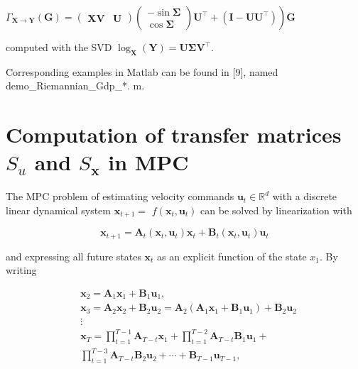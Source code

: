 \documentclass[10pt]{article}
\begin{document}
$\left.\Gamma_{\boldsymbol{X} \rightarrow \boldsymbol{Y}}(\boldsymbol{G})=\left(\begin{array}{ll}\boldsymbol{X} \boldsymbol{V} & \boldsymbol{U}\end{array}\right)\left(\begin{array}{c}-\sin \boldsymbol{\Sigma} \\ \cos \boldsymbol{\Sigma}\end{array}\right) \boldsymbol{U}^{\top}+\left(\boldsymbol{I}-\boldsymbol{U} \boldsymbol{U}^{\top}\right)\right) \boldsymbol{G}$

computed with the SVD $\log _{\boldsymbol{X}}(\boldsymbol{Y})=\boldsymbol{U} \boldsymbol{\Sigma} \boldsymbol{V}^{\top}$.

Corresponding examples in Matlab can be found in [9], named demo\_Riemannian\_Gdp\_*. $\mathrm{m}$.

\section{Computation of transfer matrices $S_{u}$ and $S_{\boldsymbol{x}}$ in MPC}
The MPC problem of estimating velocity commands $\boldsymbol{u}_{t} \in \mathbb{R}^{d}$ with a discrete linear dynamical system $\boldsymbol{x}_{t+1}=$ $f\left(\boldsymbol{x}_{t}, \boldsymbol{u}_{t}\right)$ can be solved by linearization with

$$
\boldsymbol{x}_{t+1}=\boldsymbol{A}_{t}\left(\boldsymbol{x}_{t}, \boldsymbol{u}_{t}\right) \boldsymbol{x}_{t}+\boldsymbol{B}_{t}\left(\boldsymbol{x}_{t}, \boldsymbol{u}_{t}\right) \boldsymbol{u}_{t}
$$

and expressing all future states $\boldsymbol{x}_{t}$ as an explicit function of the state $x_{1}$. By writing

$$
\begin{aligned}
& \boldsymbol{x}_{2}=\boldsymbol{A}_{1} \boldsymbol{x}_{1}+\boldsymbol{B}_{1} \boldsymbol{u}_{1}, \\
& \boldsymbol{x}_{3}=\boldsymbol{A}_{2} \boldsymbol{x}_{2}+\boldsymbol{B}_{2} \boldsymbol{u}_{2}=\boldsymbol{A}_{2}\left(\boldsymbol{A}_{1} \boldsymbol{x}_{1}+\boldsymbol{B}_{1} \boldsymbol{u}_{1}\right)+\boldsymbol{B}_{2} \boldsymbol{u}_{2} \\
& \vdots \\
& \boldsymbol{x}_{T}=\prod_{t=1}^{T-1} \boldsymbol{A}_{T-t} \boldsymbol{x}_{1}+\prod_{t=1}^{T-2} \boldsymbol{A}_{T-t} \boldsymbol{B}_{1} \boldsymbol{u}_{1}+ \\
& \prod_{t=1}^{T-3} \boldsymbol{A}_{T-t} \boldsymbol{B}_{2} \boldsymbol{u}_{2}+\cdots+\boldsymbol{B}_{T-1} \boldsymbol{u}_{T-1},
\end{aligned}
$$
\end{document}
